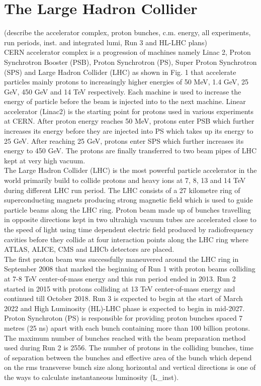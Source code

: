 \section{The Large Hadron Collider}
\label{sec:lhc}
(describe the accelerator complex, proton bunches, c.m. energy, all experiments, run periods, inst. and integrated lumi, Run 3 and HL-LHC plans) \\

\onehalfspacing CERN accelerator complex is a progression of machines namely Linac 2, Proton Synchrotron Booster (PSB), Proton Synchrotron (PS), Super Proton Synchrotron (SPS) and Large Hadron Collider (LHC) as shown in Fig. 1 that accelerate particles mainly protons to increasingly higher energies of 50 MeV, 1.4 GeV, 25 GeV, 450 GeV and 14 TeV respectively. Each machine is used to increase the energy of particle before the beam is injected into to the next machine. Linear accelerator (Linac2) is the starting point for protons used in various experiments at CERN. After proton energy reaches 50 MeV, protons enter PSB which further increases its energy before they are injected into PS which takes up its energy to 25 GeV. After reaching 25 GeV, protons enter SPS which further increases its energy to 450 GeV. The protons are finally transferred to two beam pipes of LHC kept at very high vacuum.  \\ 

The Large Hadron Collider (LHC) is the most powerful particle accelerator in the world primarily build to collide protons and heavy ions at 7, 8, 13 and 14 TeV during different LHC run period. The LHC consists of a 27 kilometre ring of superconducting magnets producing strong magnetic field which is used to guide particle beams along the LHC ring. Proton beam made up of bunches travelling in opposite directions kept in two ultrahigh vacuum tubes are accelerated close to the speed of light using time dependent electric field produced by radiofrequency cavities before they collide at four interaction points along the LHC ring where ATLAS, ALICE, CMS and LHCb detectors are placed. \\

The first proton beam was successfully maneuvered around the LHC ring in September 2008 that marked the beginning of Run 1 with proton beams colliding at 7-8 TeV center-of-mass energy and this run period ended in 2013. Run 2 started in 2015 with protons colliding at 13 TeV center-of-mass energy and continued till October 2018. Run 3 is expected to begin at the start of March 2022 and High Luminosity (HL)-LHC phase is expected to begin in mid-2027. Proton Synchroton (PS) is responsible for providing proton bunches spaced 7 metres (25 ns) apart with each bunch containing more than 100 billion protons. The maximum number of bunches reached with the beam preparation method used during Run 2 is 2556. The number of protons in the colliding bunches, time of separation between the bunches and effective area of the bunch which depend on the rms transverse bunch size along horizontal and vertical directions is one of the ways to calculate instantaneous luminosity (L_{inst}). \\

